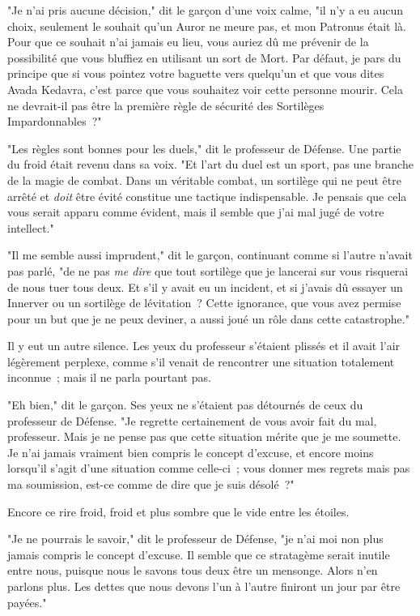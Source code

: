 "Je n'ai pris aucune décision," dit le garçon d'une voix calme, "il n'y a eu aucun choix, seulement le souhait qu'un Auror ne meure pas, et mon Patronus était là. Pour que ce souhait n'ai jamais eu lieu, vous auriez dû me prévenir de la possibilité que vous bluffiez en utilisant un sort de Mort. Par défaut, je pars du principe que si vous pointez votre baguette vers quelqu'un et que vous dites Avada Kedavra, c'est parce que vous souhaitez voir cette personne mourir. Cela ne devrait-il pas être la première règle de sécurité des Sortilèges Impardonnables~?"

"Les règles sont bonnes pour les duels," dit le professeur de Défense. Une partie du froid était revenu dans sa voix. "Et l'art du duel est un sport, pas une branche de la magie de combat. Dans un véritable combat, un sortilège qui ne peut être arrêté et \emph{doit} être évité constitue une tactique indispensable. Je pensais que cela vous serait apparu comme évident, mais il semble que j'ai mal jugé de votre intellect."

"Il me semble aussi imprudent," dit le garçon, continuant comme si l'autre n'avait pas parlé, "de ne pas \emph{me dire} que tout sortilège que je lancerai sur vous risquerai de nous tuer tous deux. Et s'il y avait eu un incident, et si j'avais dû essayer un Innerver ou un sortilège de lévitation~? Cette ignorance, que vous avez permise pour un but que je ne peux deviner, a aussi joué un rôle dans cette catastrophe."

Il y eut un autre silence. Les yeux du professeur s'étaient plissés et il avait l'air légèrement perplexe, comme s'il venait de rencontrer une situation totalement inconnue~; mais il ne parla pourtant pas.

"Eh bien," dit le garçon. Ses yeux ne s'étaient pas détournés de ceux du professeur de Défense. "Je regrette certainement de vous avoir fait du mal, professeur. Mais je ne pense pas que cette situation mérite que je me soumette. Je n'ai jamais vraiment bien compris le concept d'excuse, et encore moins lorsqu'il s'agit d'une situation comme celle-ci~; vous donner mes regrets mais pas ma soumission, est-ce comme de dire que je suis désolé~?"

Encore ce rire froid, froid et plus sombre que le vide entre les étoiles.

"Je ne pourrais le savoir," dit le professeur de Défense, "je n'ai moi non plus jamais compris le concept d'excuse. Il semble que ce stratagème serait inutile entre nous, puisque nous le savons tous deux être un mensonge. Alors n'en parlons plus. Les dettes que nous devons l'un à l'autre finiront un jour par être payées."

